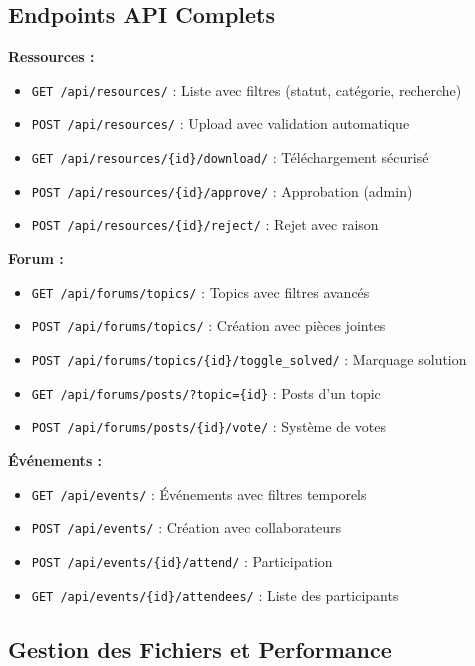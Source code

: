 \documentclass[12pt,a4paper]{article}
\begin{document}
\subsection{Endpoints API Complets}

\textbf{Ressources :}
\begin{itemize}
    \item \texttt{GET /api/resources/} : Liste avec filtres (statut, catégorie, recherche)
    \item \texttt{POST /api/resources/} : Upload avec validation automatique
    \item \texttt{GET /api/resources/\{id\}/download/} : Téléchargement sécurisé
    \item \texttt{POST /api/resources/\{id\}/approve/} : Approbation (admin)
    \item \texttt{POST /api/resources/\{id\}/reject/} : Rejet avec raison
\end{itemize}

\textbf{Forum :}
\begin{itemize}
    \item \texttt{GET /api/forums/topics/} : Topics avec filtres avancés
    \item \texttt{POST /api/forums/topics/} : Création avec pièces jointes
    \item \texttt{POST /api/forums/topics/\{id\}/toggle\_solved/} : Marquage solution
    \item \texttt{GET /api/forums/posts/?topic=\{id\}} : Posts d'un topic
    \item \texttt{POST /api/forums/posts/\{id\}/vote/} : Système de votes
\end{itemize}

\textbf{Événements :}
\begin{itemize}
    \item \texttt{GET /api/events/} : Événements avec filtres temporels
    \item \texttt{POST /api/events/} : Création avec collaborateurs
    \item \texttt{POST /api/events/\{id\}/attend/} : Participation
    \item \texttt{GET /api/events/\{id\}/attendees/} : Liste des participants
\end{itemize}

\subsection{Gestion des Fichiers et Performance}
\end{document}

